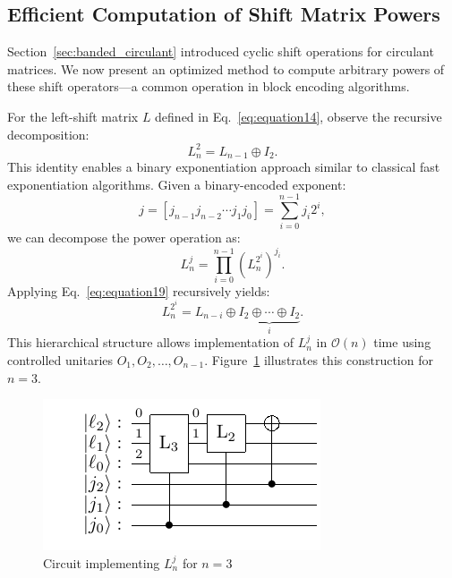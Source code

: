 \documentclass{article}
\begin{document}
    \subsection{Efficient Computation of Shift Matrix Powers}

    Section~\ref{sec:banded_circulant} introduced cyclic shift operations for circulant matrices. We now present an optimized method to compute arbitrary powers of these shift operators—a common operation in block encoding algorithms.

    For the left-shift matrix $L$ defined in Eq.~\eqref{eq:equation14}, observe the recursive decomposition:
    \begin{equation}
        L_n^2 = L_{n-1} \oplus I_2.\label{eq:equation19}
    \end{equation}
    This identity enables a binary exponentiation approach similar to classical fast exponentiation algorithms. Given a binary-encoded exponent:
    \begin{equation}
        j = [j_{n-1} j_{n-2} \cdots j_1 j_0] = \sum_{i=0}^{n-1} j_i 2^i,
    \end{equation}
    we can decompose the power operation as:
    \begin{equation}
        L_n^j = \prod_{i=0}^{n-1} \left(L_n^{2^i} \right)^{j_i}.
    \end{equation}
    Applying Eq.~\ref{eq:equation19} recursively yields:
    \begin{equation}
        L_n^{2^i} = L_{n-i} \oplus \underbrace{I_2 \oplus \cdots \oplus I_2}_{i}.
    \end{equation}
    This hierarchical structure allows implementation of $L_n^j$ in $\mathcal{O}(n)$ time using controlled unitaries $O_1, O_2, \ldots, O_{n-1}$. Figure~\ref{fig:shift_power} illustrates this construction for $n=3$.

    \begin{figure}[htbp]
        \centering
        \includegraphics{pdf/shift_power}
        \caption{Circuit implementing $L_n^j$ for $n=3$}
        \label{fig:shift_power}
    \end{figure}
\end{document}
